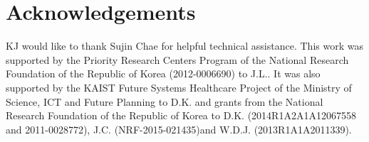 \section*{Acknowledgements}

KJ would like to thank Sujin Chae for helpful technical assistance. This work was supported by the Priority Research Centers Program of the National Research Foundation of the Republic of Korea (2012-0006690) to J.L.. It was also supported by the KAIST Future Systems Healthcare Project of the Ministry of Science, ICT and Future Planning to D.K. and grants from the National Research Foundation of the Republic of Korea to D.K. (2014R1A2A1A12067558 and 2011-0028772), J.C. (NRF-2015-021435)and W.D.J. (2013R1A1A2011339).
